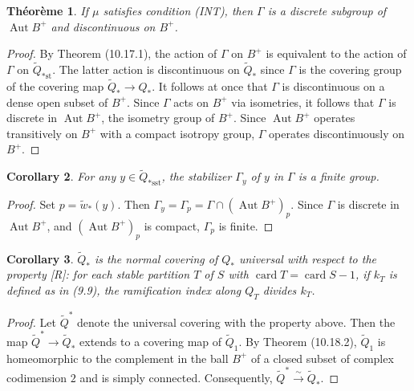 \documentclass[12pt,a4paper]{article}
\theoremstyle{plain}
\newtheorem{theorem}{Th\'eor\`eme}[section]
\newtheorem{corollary}[theorem]{Corollary}
\theoremstyle{definition}
\theoremstyle{remark}
\DeclareMathOperator{\Aut}{Aut}
\DeclareMathOperator{\card}{card}
\begin{document}
\begin{theorem}
\label{10.19}
If $\mu$ satisfies condition (INT), then $\Gamma$ is a discrete subgroup of $\Aut B^+$ and discontinuous on $B^+$.
\end{theorem}

\begin{proof}
By Theorem (10.17.1), the action of $\Gamma$ on $B^+$ is equivalent to the action of $\Gamma$ on $\widetilde{Q}_{*\text{st}}$. The latter action is discontinuous on $\widetilde{Q}_*$ since $\Gamma$ is the covering group of the covering map $\widetilde{Q}_* \to Q_*$. It follows at once that $\Gamma$ is discontinuous on a dense open subset of $B^+$. Since $\Gamma$ acts on $B^+$ via isometries, it follows that $\Gamma$ is discrete in $\Aut B^+$, the isometry group of $B^+$. Since $\Aut B^+$ operates transitively on $B^+$ with a compact isotropy group, $\Gamma$ operates discontinuously on $B^+$.
\end{proof}

\begin{corollary}
\label{10.19.1}
For any $y \in \widetilde{Q}_{*\text{sst}}$, the stabilizer $\Gamma_y$ of $y$ in $\Gamma$ is a finite group.
\end{corollary}

\begin{proof}
Set $p = \widetilde{w}_*(y)$. Then $\Gamma_y = \Gamma_p = \Gamma \cap (\Aut B^+)_p$. Since $\Gamma$ is discrete in $\Aut B^+$, and $(\Aut B^+)_p$ is compact, $\Gamma_p$ is finite.
\end{proof}

\begin{corollary}
\label{10.19.2}
$\widetilde{Q}_*$ is the normal covering of $Q_*$ universal with respect to the property [R]: for each stable partition $T$ of $S$ with $\card T = \card S - 1$, if $k_T$ is defined as in (9.9), the ramification index along $Q_T$ divides $k_T$.
\end{corollary}

\begin{proof}
Let $\widetilde{Q}^*$ denote the universal covering with the property above. Then the map $\widetilde{Q}^* \to \widetilde{Q}_*$ extends to a covering map of $\widetilde{Q}_1$. By Theorem (10.18.2), $\widetilde{Q}_1$ is homeomorphic to the complement in the ball $B^+$ of a closed subset of complex codimension $2$ and is simply connected. Consequently, $\widetilde{Q}^* \xrightarrow{\sim} \widetilde{Q}_*$.
\end{proof}
\end{document}
